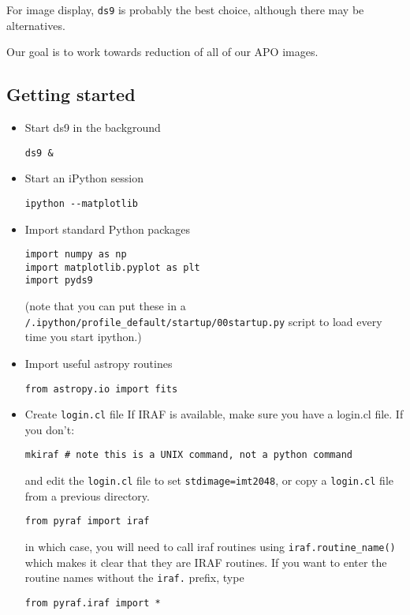 \documentclass{article}
\begin{document}
For image display, \texttt{ds9} is probably the best choice, although there may
be alternatives.

Our goal is to work towards reduction of all of our APO images.

\subsection*{Getting started}
\begin{itemize}
\item Start ds9 in the background
\begin{verbatim}
ds9 &
\end{verbatim}
\item Start an iPython session
\begin{verbatim}
ipython --matplotlib
\end{verbatim}

\item Import standard Python packages
\begin{verbatim}
import numpy as np
import matplotlib.pyplot as plt
import pyds9
\end{verbatim}
(note that you can put these in a
\texttt{/.ipython/profile\_default/startup/00startup.py}
script to load every time you start ipython.)

\item Import useful astropy routines
\begin{verbatim}
from astropy.io import fits
\end{verbatim}

\item Create \texttt{login.cl} file
If IRAF is available, make sure you have a login.cl file. If you don't:
\begin{verbatim}
mkiraf # note this is a UNIX command, not a python command
\end{verbatim}
and edit the \texttt{login.cl} file to set \texttt{stdimage=imt2048},
or copy a \texttt{login.cl} file from a previous directory.
\begin{verbatim}
from pyraf import iraf
\end{verbatim}
in which case, you will need to call iraf routines using
\texttt{iraf.routine\_name()}
which makes it clear that they are IRAF routines. If you want to
enter the routine names without the \texttt{iraf.} prefix, type
\begin{verbatim}
from pyraf.iraf import *
\end{verbatim}
\end{itemize}
\end{document}
